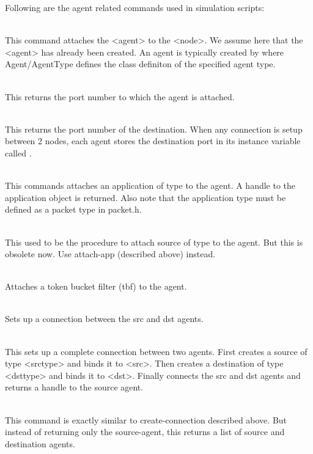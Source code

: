 Following are the agent related commands used in simulation scripts:
\begin{flushleft}
\\
This command attaches the <agent> to the <node>. We assume here that the
<agent> has already been created. An agent is typically created by
where Agent/AgentType defines the class definiton of the specified agent
type.


\\
This returns the port number to which the agent is attached.


\\
This returns the port number of the destination.
When any connection is setup between 2 nodes, each agent stores the 
destination port in its instance variable called .


\\
This commands attaches an application of type  to the agent.
A handle to the application object is returned. Also note that the application
type must be defined as a packet type in packet.h.


\\
This used to be the procedure to attach source of type  to
the agent. But this is obsolete now. Use attach-app (described above)
instead.


\\
Attaches a token bucket filter (tbf) to the agent.


\\
Sets up a connection between the src and dst agents. 


\\
This sets up a complete connection between two agents. First creates a source
of type <srctype> and binds it to <src>. Then creates a destination of type
<dsttype> and binds it to <dst>. Finally connects the src and dst agents and
returns a handle to the source agent.


\\
This command is exactly similar to create-connection described above. But
instead of returning only the source-agent, this returns a list of source and
destination agents.



\end{flushleft}
